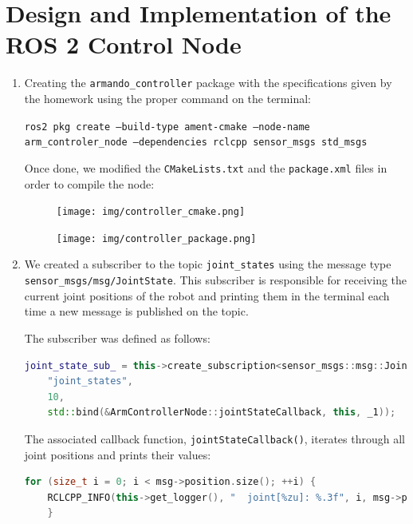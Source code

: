 \documentclass{article}
\begin{document}
\section{Design and Implementation of the ROS 2 Control Node}
\begin{enumerate}
    \item Creating the \lstinline{armando_controller} package with the specifications given by the homework using the proper command on the terminal:
       \begin{center}
       \small
        \texttt{ros2 pkg create --build-type ament-cmake --node-name
        \lstinline{arm_controler_node} --dependencies rclcpp \lstinline{sensor_msgs std_msgs}}
        \end{center}
\noindent Once done, we modified the \lstinline{CMakeLists.txt} and the \lstinline{package.xml} files in order to compile the node: 
    \begin{figure}[h]
        \centering
        \texttt{[image: img/controller\_cmake.png]}
        \label{fig:controller_cmake}
    \end{figure}
        \begin{figure}[h]
        \centering
        \texttt{[image: img/controller\_package.png]}
        \label{fig:controller_package}
    \end{figure}
    \item We created a subscriber to the topic \texttt{joint\_states} using the message type \texttt{sensor\_msgs/msg/JointState}. 
    This subscriber is responsible for receiving the current joint positions of the robot and printing them in the terminal each time a new message is published on the topic. 

    The subscriber was defined as follows:

\begin{lstlisting}[language=C++]
    joint_state_sub_ = this->create_subscription<sensor_msgs::msg::JointState>(
    "joint_states",
    10,
    std::bind(&ArmControllerNode::jointStateCallback, this, _1));
\end{lstlisting}
    
The associated callback function, \texttt{jointStateCallback()}, iterates through all joint positions and prints their values:
\begin{lstlisting}[language=C++]
    for (size_t i = 0; i < msg->position.size(); ++i) {
    RCLCPP_INFO(this->get_logger(), "  joint[%zu]: %.3f", i, msg->position[i]);
    }
\end{lstlisting}


\end{enumerate}
\end{document}
